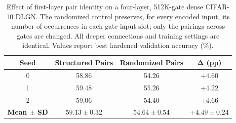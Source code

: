\begin{table}[t]
\centering
\caption{Effect of first-layer pair identity on a four-layer, 512K-gate
dense CIFAR-10 DLGN. The randomized control preserves, for every encoded
input, its number of occurrences in each gate-input slot; only the
pairings across gates are changed. All deeper connections and training
settings are identical. Values report best hardened validation accuracy
(\%).}
\label{tab:motivation}
\small
\setlength{\tabcolsep}{4pt}
\begin{tabular}{c|cc|c}
\hline
\textbf{Seed} &
\textbf{Structured Pairs} &
\textbf{Randomized Pairs} &
$\mathbf{\Delta}$ \textbf{(pp)} \\
\hline
0 & 58.86 & 54.26 & +4.60 \\
1 & 59.48 & 55.26 & +4.22 \\
2 & 59.06 & 54.40 & +4.66 \\
\hline
\textbf{Mean $\pm$ SD}
& $\mathbf{59.13\pm0.32}$
& $54.64\pm0.54$
& $\mathbf{+4.49\pm0.24}$ \\
\hline
\end{tabular}
\end{table}